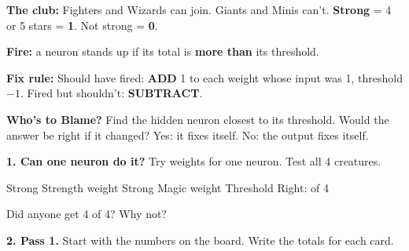 \documentclass[11pt]{article}
\begin{document}
\partner

\textbf{The club:} Fighters and Wizards can join. Giants and Minis can't. \quad \textbf{Strong} = 4 or 5 stars = \textbf{1}. Not strong = \textbf{0}.

\vspace{0.2em}
\textbf{Fire:} a neuron stands up if its total is \textbf{more than} its threshold.

\vspace{0.2em}
\textbf{Fix rule:} Should have fired: \textbf{ADD} 1 to each weight whose input was 1, threshold $-1$. \quad Fired but shouldn't: \textbf{SUBTRACT}.

\vspace{0.2em}
\textbf{Who's to Blame?} Find the hidden neuron closest to its threshold. Would the answer be right if it changed? Yes: it fixes itself. No: the output fixes itself.

\vspace{0.6em}
{\large\textbf{1. Can one neuron do it?}} Try weights for one neuron. Test all 4 creatures.

\vspace{0.3em}
Strong Strength weight \blank{0.5in} \quad Strong Magic weight \blank{0.5in} \quad Threshold \blank{0.5in} \quad Right: \blank{0.4in} of 4

\vspace{0.5em}
Did anyone get 4 of 4?  \quad Why not? 

\vspace{0.9em}
{\large\textbf{2. Pass 1.}} Start with the numbers on the board. Write the totals for each card.
\end{document}
